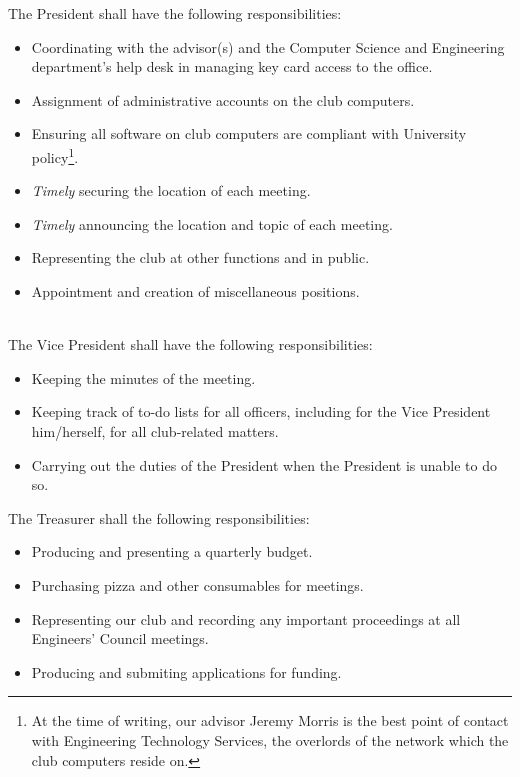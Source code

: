 \documentclass{article}
\begin{document}
	The President shall have the following responsibilities:
	\begin{itemize}
		\item Coordinating with the advisor(s) and the Computer Science and Engineering department's help desk in managing key card access to the office.
		\item Assignment of administrative accounts on the club computers.
		\item Ensuring all software on club computers are compliant with University policy\footnote{At the time of writing, our advisor Jeremy Morris is the best point of contact with Engineering Technology Services, the overlords of the network which the club computers reside on.}.
		\item \textit{Timely} securing the location of each meeting.
		\item \textit{Timely} announcing the location and topic of each meeting.
		\item Representing the club at other functions and in public.
		\item Appointment and creation of miscellaneous positions.\\\\
	\end{itemize}
	
	The Vice President shall have the following responsibilities:
	\begin{itemize}
		\item Keeping the minutes of the meeting.
		\item Keeping track of to-do lists for all officers, including for the Vice President him/herself, for all club-related matters.
		\item Carrying out the duties of the President when the President is unable to do so.\\
	\end{itemize}

	The Treasurer shall the following responsibilities:
	\begin{itemize}
		\item Producing and presenting a quarterly budget.
		\item Purchasing pizza and other consumables for meetings.
		\item Representing our club and recording any important proceedings at all Engineers' Council meetings.
		\item Producing and submiting applications for funding.\\
	\end{itemize}
\end{document}
